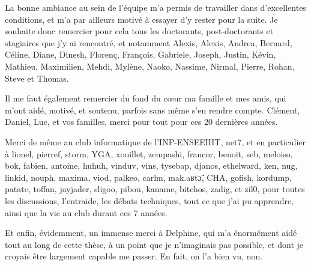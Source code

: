 La bonne ambiance au sein de l'équipe m'a permis de travailler dans d'excellentes conditions, et m'a par ailleurs
motivé à essayer d'y rester pour la suite. Je souhaite donc remercier pour cela tous les doctorants, post-doctorants
et stagiaires que j'y ai rencontré, et notamment Alexis, Alexis, Andrea, Bernard, Céline, Diane, Dinesh, Florenç,
François, Gabriele, Joseph, Justin, Kévin, Mathieu, Maximilien, Mehdi, Mylène, Naoko, Nassime, Nirmal, Pierre, Rohan, Steve et
Thomas.

Il me faut également remercier du fond du cœur ma famille et mes amis, qui m'ont aidé, motivé, et soutenu, parfois sans
même s'en rendre compte. Clément, Daniel, Luc, et vos familles, merci pour tout pour ces 20 dernières années.

Merci de même au club informatique de l'INP-ENSEEIHT, net7, et en particulier à lionel, pierref, storm, YGA, xouillet,
zempashi, francor, benoit, seb, meloiso, bok, fabien, antoine, huhuh, vinduv, vins, tysebap, djanos, ethelward, ken,
nug, linkid, nouph, maxima, viod, palkeo, carlm, mak.aʁtɔ̃, CHA, gofish, kordump, patate, toffan, jayjader, sligoo,
pibou, kaname, bitchos, zadig, et zil0, pour toutes les discussions, l'entraide, les débats techniques, tout ce que
j'ai pu apprendre, ainsi que la vie au club durant ces 7 années.

Et enfin, évidemment, un immense merci à Delphine, qui m'a énormément aidé tout au long de cette thèse, à un point que
je n'imaginais pas possible, et dont je croyais être largement capable me passer. En fait, on l'a bien vu, non.
